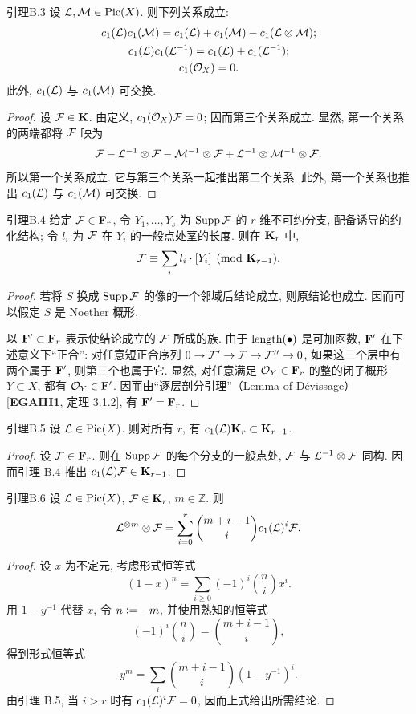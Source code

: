 \begin{origstatement}{引理}{B.3}\label{appB:3}
设 $\mathcal L,\mathcal M\in\operatorname{Pic}(X)$. 则下列关系成立:
\begin{gather*}
c_1(\mathcal L)c_1(\mathcal M)=c_1(\mathcal L)+c_1(\mathcal M)-c_1(\mathcal L\otimes\mathcal M);\\
c_1(\mathcal L)c_1(\mathcal L^{-1})=c_1(\mathcal L)+c_1(\mathcal L^{-1});\\
c_1(\mathcal O_X)=0.
\end{gather*}
此外, $c_1(\mathcal L)$ 与 $c_1(\mathcal M)$ 可交换.
\end{origstatement}
\begin{proof}
设 $\mathcal F\in\mathbf K$. 由定义, $c_1(\mathcal O_X)\mathcal F=0$; 因而第三个关系成立. 显然, 第一个关系的两端都将 $\mathcal F$ 映为
\[\mathcal F-\mathcal L^{-1}\otimes\mathcal F-\mathcal M^{-1}\otimes\mathcal F+\mathcal L^{-1}\otimes\mathcal M^{-1}\otimes\mathcal F.\]
所以第一个关系成立. 它与第三个关系一起推出第二个关系. 此外, 第一个关系也推出 $c_1(\mathcal L)$ 与 $c_1(\mathcal M)$ 可交换.
\end{proof}

\begin{origstatement}{引理}{B.4}\label{appB:4}
给定 $\mathcal F\in\mathbf F_r$, 令 $Y_1,\ldots,Y_s$ 为 $\operatorname{Supp}\mathcal F$ 的 $r$ 维不可约分支, 配备诱导的约化结构; 令 $l_i$ 为 $\mathcal F$ 在 $Y_i$ 的一般点处茎的长度. 则在 $\mathbf K_r$ 中,
\[\mathcal F\equiv\sum_i l_i\cdot[Y_i]\pmod{\mathbf K_{r-1}}.\]
\end{origstatement}
\begin{proof}
若将 $S$ 换成 $\operatorname{Supp}\mathcal F$ 的像的一个邻域后结论成立, 则原结论也成立. 因而可以假定 $S$ 是 Noether 概形.

以 $\mathbf F'\subset\mathbf F_r$ 表示使结论成立的 $\mathcal F$ 所成的族. 由于 $\operatorname{length}(\bullet)$ 是可加函数, $\mathbf F'$ 在下述意义下“正合”: 对任意短正合序列 $0\to\mathcal F'\to\mathcal F\to\mathcal F''\to0$, 如果这三个层中有两个属于 $\mathbf F'$, 则第三个也属于它. 显然, 对任意满足 $\mathcal O_Y\in\mathbf F_r$ 的整的闭子概形 $Y\subset X$, 都有 $\mathcal O_Y\in\mathbf F'$. 因而由“逐层剖分引理”（Lemma of Dévissage）[\textbf{EGAIII1}, 定理 3.1.2], 有 $\mathbf F'=\mathbf F_r$.
\end{proof}

\begin{origstatement}{引理}{B.5}\label{appB:5}
设 $\mathcal L\in\operatorname{Pic}(X)$. 则对所有 $r$, 有 $c_1(\mathcal L)\mathbf K_r\subset\mathbf K_{r-1}$.
\end{origstatement}
\begin{proof}
设 $\mathcal F\in\mathbf F_r$. 则在 $\operatorname{Supp}\mathcal F$ 的每个分支的一般点处, $\mathcal F$ 与 $\mathcal L^{-1}\otimes\mathcal F$ 同构. 因而引理 B.4 推出 $c_1(\mathcal L)\mathcal F\in\mathbf K_{r-1}$.
\end{proof}

\begin{origstatement}{引理}{B.6}\label{appB:6}
设 $\mathcal L\in\operatorname{Pic}(X)$, $\mathcal F\in\mathbf K_r$, $m\in\mathbb Z$. 则
\[\mathcal L^{\otimes m}\otimes\mathcal F=\sum_{i=0}^r\binom{m+i-1}{i}c_1(\mathcal L)^i\mathcal F.\]
\end{origstatement}
\begin{proof}
设 $x$ 为不定元, 考虑形式恒等式
\[(1-x)^n=\sum_{i\ge0}(-1)^i\binom ni x^i.\]
用 $1-y^{-1}$ 代替 $x$, 令 $n\mathrel{\mathop:}=-m$, 并使用熟知的恒等式
\[(-1)^i\binom ni=\binom{m+i-1}{i},\]
得到形式恒等式
\[y^m=\sum_i\binom{m+i-1}{i}(1-y^{-1})^i.\]
由引理 B.5, 当 $i>r$ 时有 $c_1(\mathcal L)^i\mathcal F=0$, 因而上式给出所需结论.
\end{proof}

